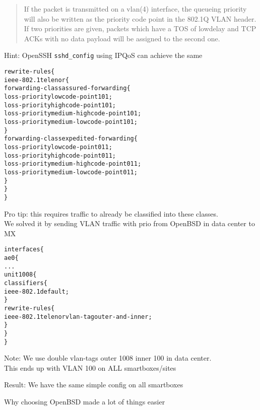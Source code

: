 \documentclass[Screen16to9,17pt]{foils}
\begin{document}
\begin{quote}
If the packet is transmitted on a vlan(4) interface, the queueing priority will also be written as
the priority code point in the 802.1Q VLAN header.  If two
priorities are given, packets which have a TOS of lowdelay and
TCP ACKs with no data payload will be assigned to the second one.
\end{quote}

Hint: OpenSSH \verb+sshd_config+ using IPQoS can achieve the same


\begin{alltt}\footnotesize
rewrite-rules \{
    ieee-802.1 telenor \{
        forwarding-class assured-forwarding \{
            loss-priority low code-point 101;
            loss-priority high code-point 101;
            loss-priority medium-high code-point 101;
            loss-priority medium-low code-point 101;
        \}
        forwarding-class expedited-forwarding \{
            loss-priority low code-point 011;
            loss-priority high code-point 011;
            loss-priority medium-high code-point 011;
            loss-priority medium-low code-point 011;
        \}
    \}
\}
\end{alltt}

Pro tip: this requires traffic to already be classified into these classes.\\
We solved it by sending VLAN traffic with prio from OpenBSD in data center to MX


\begin{alltt}\small
interfaces \{
    ae0 \{
        ...
        unit 1008 \{
            classifiers \{
                ieee-802.1 default;
            \}
            rewrite-rules \{
                ieee-802.1 telenor vlan-tag outer-and-inner;
            \}
        \}
\}
\end{alltt}

Note: We use double vlan-tags outer 1008 inner 100 in data center.\\
This ends up with VLAN 100 on ALL smartboxes/sites

Result: We have the same simple config on all smartboxes


Why choosing OpenBSD made a lot of things easier
\end{document}
